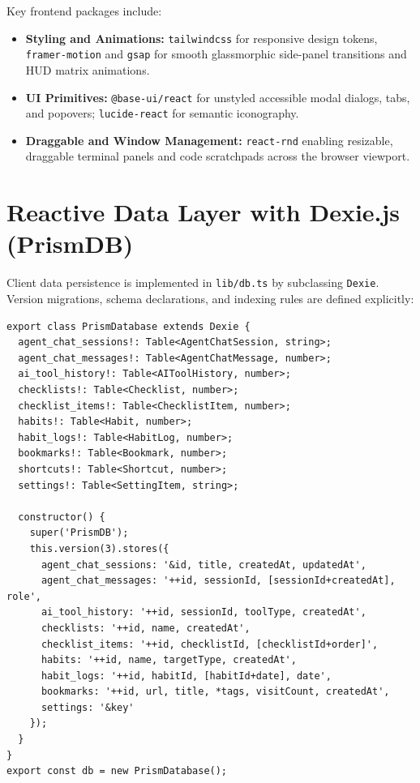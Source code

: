 \documentclass[12pt,a4paper]{report}
\begin{document}
Key frontend packages include:
\begin{itemize}
    \item \textbf{Styling and Animations:} \texttt{tailwindcss} for responsive design tokens, \texttt{framer-motion} and \texttt{gsap} for smooth glassmorphic side-panel transitions and HUD matrix animations.
    \item \textbf{UI Primitives:} \texttt{@base-ui/react} for unstyled accessible modal dialogs, tabs, and popovers; \texttt{lucide-react} for semantic iconography.
    \item \textbf{Draggable and Window Management:} \texttt{react-rnd} enabling resizable, draggable terminal panels and code scratchpads across the browser viewport.
\end{itemize}

\section{Reactive Data Layer with Dexie.js (PrismDB)}
Client data persistence is implemented in \texttt{lib/db.ts} by subclassing \texttt{Dexie}. Version migrations, schema declarations, and indexing rules are defined explicitly:

\begin{singlespace}\small
\begin{verbatim}
export class PrismDatabase extends Dexie {
  agent_chat_sessions!: Table<AgentChatSession, string>;
  agent_chat_messages!: Table<AgentChatMessage, number>;
  ai_tool_history!: Table<AIToolHistory, number>;
  checklists!: Table<Checklist, number>;
  checklist_items!: Table<ChecklistItem, number>;
  habits!: Table<Habit, number>;
  habit_logs!: Table<HabitLog, number>;
  bookmarks!: Table<Bookmark, number>;
  shortcuts!: Table<Shortcut, number>;
  settings!: Table<SettingItem, string>;

  constructor() {
    super('PrismDB');
    this.version(3).stores({
      agent_chat_sessions: '&id, title, createdAt, updatedAt',
      agent_chat_messages: '++id, sessionId, [sessionId+createdAt], role',
      ai_tool_history: '++id, sessionId, toolType, createdAt',
      checklists: '++id, name, createdAt',
      checklist_items: '++id, checklistId, [checklistId+order]',
      habits: '++id, name, targetType, createdAt',
      habit_logs: '++id, habitId, [habitId+date], date',
      bookmarks: '++id, url, title, *tags, visitCount, createdAt',
      settings: '&key'
    });
  }
}
export const db = new PrismDatabase();
\end{verbatim}
\end{singlespace}
\end{document}
